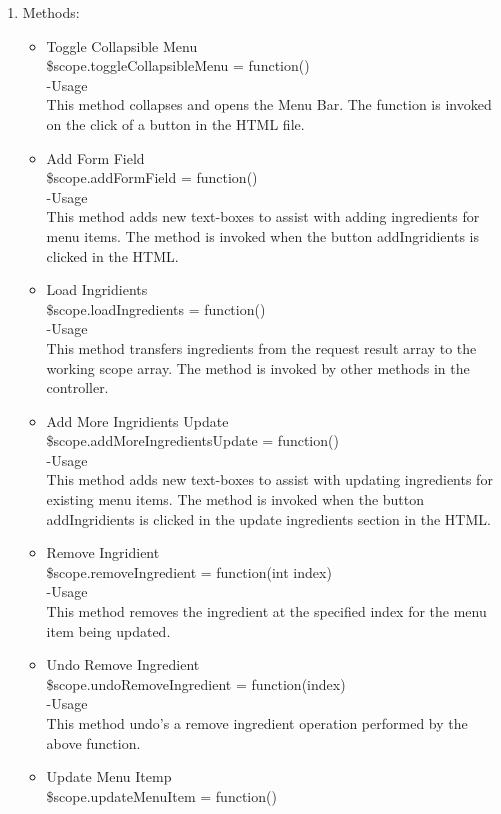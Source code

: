 \documentclass[a4paper,12pt]{article}
\begin{document}
\begin{enumerate}
\item Methods:
	\begin{itemize}
		\item Toggle Collapsible Menu\\
		\$scope.toggleCollapsibleMenu = function()\\
		-Usage\\
		This method collapses and opens the Menu Bar. The function is invoked on the click of a button in the HTML file.
		\item Add Form Field\\
		\$scope.addFormField = function()\\
		-Usage\\
		This method adds new text-boxes to assist with adding ingredients for menu items. The method is invoked when the button addIngridients is clicked in the HTML.
		\item Load Ingridients\\
		\$scope.loadIngredients = function()\\
		-Usage\\
		This method transfers ingredients from the request result array to the working scope array. The method is invoked by other methods in the controller.
		\item Add More Ingridients Update\\
		\$scope.addMoreIngredientsUpdate = function()\\
		-Usage\\
		This method adds new text-boxes to assist with updating ingredients for existing menu items. The method is invoked when the button addIngridients is clicked in the update ingredients section in the HTML.
		\item Remove Ingridient\\
		\$scope.removeIngredient = function(int index)\\
		-Usage\\
		This method removes the ingredient at the specified index for the menu item being updated.
		\item Undo Remove Ingredient\\
		\$scope.undoRemoveIngredient = function(index)\\
		-Usage\\
		This method undo's a remove ingredient operation performed by the above function.
		\item Update Menu Itemp\\
		\$scope.updateMenuItem = function()\\

\end{itemize}
\end{enumerate}
\end{document}
